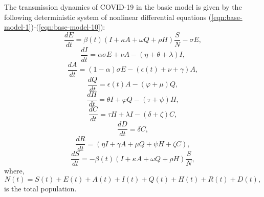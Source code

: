 \documentclass[authoryear,preprint]{elsarticle}
\begin{document}
The transmission dynamics of COVID-19 in the basic model is given by the following deterministic system of nonlinear differential equations (\ref{eqn:base-model-1})-(\ref{eqn:base-model-10}):
\begin{equation}
\frac{dE}{dt} = \beta(t) \left( I + \kappa A + \omega Q + \rho H \right) \frac{S}{N} - \sigma E, 
\label{eqn:base-model-1}
\end{equation}
\begin{equation}
\frac{dI}{dt} = \alpha \sigma E + \nu A - \left( \eta + \theta + \lambda \right) I,
\label{eqn:base-model-2}
\end{equation}
\begin{equation}
\frac{dA}{dt} =  \left( 1-\alpha \right) \sigma E - \left( \epsilon(t) + \nu + \gamma \right) A,
\label{eqn:base-model-3}
\end{equation}
\begin{equation}
\frac{dQ}{dt} = \epsilon(t) A - \left( \varphi + \mu \right) Q,
\label{eqn:base-model-4}
\end{equation}
\begin{equation}
\frac{dH}{dt} = \theta I + \varphi Q - \left( \tau + \psi \right) H ,
\label{eqn:base-model-5}
\end{equation}
\begin{equation}
\frac{dC}{dt} =  \tau H + \lambda I - \left( \delta + \zeta \right) C,
\label{eqn:base-model-6}
\end{equation}
\begin{equation}
\frac{dD}{dt} =  \delta C,
\label{eqn:base-model-7}
\end{equation}
\begin{equation}
\frac{dR}{dt} =  \left( \eta I +  \gamma A + \mu Q + \psi H + \zeta C \right),
\label{eqn:base-model-8}
\end{equation}
\begin{equation}
\frac{dS}{dt} = -\beta(t) \left( I + \kappa A + \omega Q + \rho H \right) \frac{S}{N},
\label{eqn:base-model-9}
\end{equation}
where,
\begin{equation}
N(t) = S(t) + E(t) + A(t) + I(t) + Q(t) + H(t) + R(t) + D(t),
\label{eqn:base-model-10}
\end{equation}
is the total population. 
\end{document}
